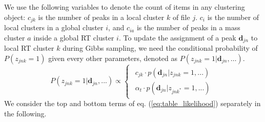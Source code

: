 We use the following variables to denote the count of items in any clustering object: $c_{jk}$ is the number of peaks in a local cluster $k$ of file $j$. $c_{i}$ is the number of local clusters in a global cluster $i$, and $c_{ia}$ is the number of peaks in a mass cluster $a$ inside a global RT cluster $i$. To update the assignment of a peak $\mathbf{d}_{jn}$ to local RT cluster $k$ during Gibbs sampling, we need the conditional probability of $P(z_{jnk}=1)$ given every other parameters, denoted as $P(z_{jnk}=1 \vert \mathbf{d}_{jn},\ldots)$.
\begin{dmath}
P(z_{jnk}=1 \vert \mathbf{d}_{jn},...)\propto\begin{cases}
\begin{array}{c}
c_{jk}\cdot p(\mathbf{d}_{jn} \vert z_{jnk}=1,...)\\
\alpha_{t}\cdot p(\mathbf{d}_{jn} \vert z_{jnk^{*}}=1,...)
\end{array}\end{cases}\label{eq:table_likelihood}
\end{dmath}
We consider the top and bottom terms of eq. (\ref{eq:table_likelihood}) separately in the following.
